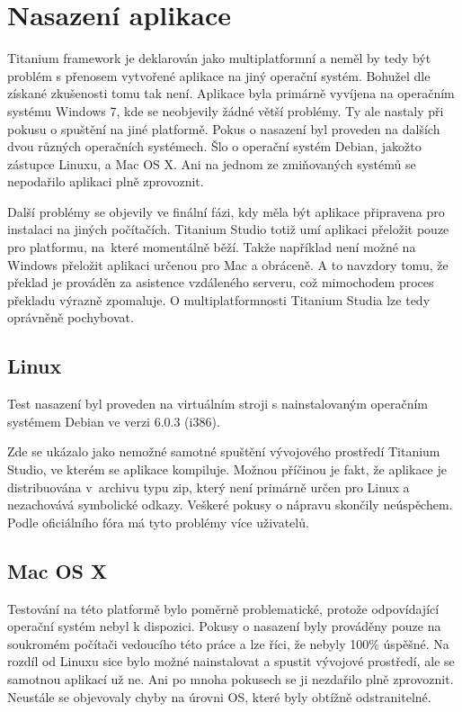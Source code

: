 \chapter{Nasazení aplikace}

Titanium framework je deklarován jako multiplatformní a neměl by tedy být problém s přenosem vytvořené aplikace na jiný operační systém. Bohužel dle získané zkušenosti tomu tak není. Aplikace byla primárně vyvíjena na operačním systému Windows 7, kde se neobjevily žádné větší problémy. Ty ale nastaly při pokusu o spuštění na jiné platformě. Pokus o nasazení byl proveden na dalších dvou různých operačních systémech. Šlo o operační systém Debian\cite{debian}, jakožto zástupce Linuxu, a Mac OS X\cite{mac}. Ani na jednom ze zmiňovaných systémů se nepodařilo aplikaci plně zprovoznit.

Další problémy se objevily ve finální fázi, kdy měla být aplikace připravena pro instalaci na jiných počítačích. Titanium Studio totiž umí aplikaci přeložit pouze pro platformu, na~které momentálně běží. Takže například není možné na Windows přeložit aplikaci určenou pro Mac a obráceně. A to navzdory tomu, že překlad je prováděn za asistence vzdáleného serveru, což mimochodem proces překladu výrazně zpomaluje. O multiplatformnosti Titanium Studia lze tedy oprávněně pochybovat.

\section{Linux}
Test nasazení byl proveden na virtuálním stroji s nainstalovaným operačním systémem Debian ve verzi 6.0.3 (i386).

Zde se ukázalo jako nemožné samotné spuštění vývojového prostředí Titanium Studio, ve kterém se aplikace kompiluje. Možnou příčinou je fakt, že aplikace je distribuována v~archivu typu zip, který není primárně určen pro Linux a nezachovává symbolické odkazy. Veškeré pokusy o nápravu skončily neúspěchem. Podle oficiálního fóra má tyto problémy více uživatelů.

\section{Mac OS X}

Testování na této platformě bylo poměrně problematické, protože odpovídající operační systém nebyl k dispozici. Pokusy o nasazení byly prováděny pouze na soukromém počítači vedoucího této práce a lze říci, že nebyly 100\% úspěšné. Na rozdíl od Linuxu sice bylo možné nainstalovat a spustit vývojové prostředí, ale se samotnou aplikací už ne. Ani po mnoha pokusech se ji nezdařilo plně zprovoznit. Neustále se objevovaly chyby na úrovni OS, které byly obtížně odstranitelné.